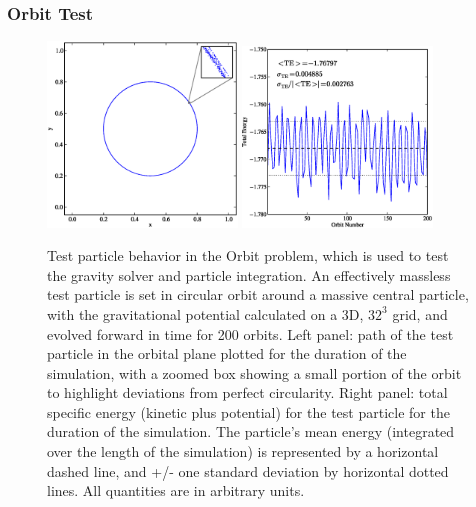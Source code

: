 \subsubsection{Orbit Test}
\label{sec.test.testorbit}

\begin{figure}
\begin{center}
\includegraphics[width=0.45\textwidth]{figures/TestOrbit_xy.eps}
\includegraphics[width=0.45\textwidth]{figures/TestOrbit_TotalEnergy.eps}
\caption{Test particle behavior in the Orbit problem, which is used to
test the gravity solver and particle integration.  An effectively
massless test particle is set in circular orbit around a massive
central particle, with the gravitational potential calculated on a 3D,
$32^3$ grid, and evolved forward in time for 200 orbits.  Left panel:
path of the test particle in the orbital plane plotted for the
duration of the simulation, with a zoomed box showing a small portion
of the orbit to highlight deviations from perfect circularity.  Right panel: total specific energy
(kinetic plus potential) for the test particle for the duration of the
simulation.  The particle's mean energy (integrated over the length of
the simulation) is represented by a horizontal dashed line, and +/-
one standard deviation by horizontal dotted lines.  All quantities are
in arbitrary units.}
\label{fig.orbittest}
\end{center}
\end{figure}

